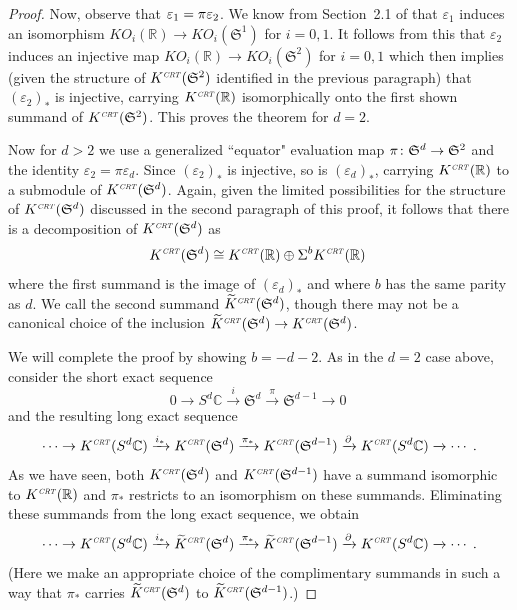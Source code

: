 \documentclass[12pt, reqno]{amsart}
\theoremstyle{definition}
\def\ve{\varepsilon}
\def\R{{\mathbb R}}
\def\C{{\mathbb C}}
\def\crt{^{\scriptscriptstyle {\it CRT}}}
\newcommand{\fS}{\mathfrak S}
\begin{document}
\begin{proof}
Now, observe that $\ve_1 = \pi_{\rm } \ve_2$. We know from Section~2.1 of \cite{Boer2002} that $\ve_1$ induces an isomorphism  $KO_i(\R) \rightarrow KO_i(\fS^1)$ for $i = 0,1$. It follows from this that $\ve_2$ induces an injective map $KO_i(\R) \rightarrow KO_i(\fS^2)$ for $i = 0,1$ which then implies (given the structure of $K\crt(\fS^2)$ identified in the previous paragraph) that $(\ve_2)_*$ is injective, carrying $K\crt(\R)$ isomorphically onto the first shown summand of $K\crt(\fS^2)$. This proves the theorem for $d= 2$.

Now for $d > 2$ we use a generalized ``equator" evaluation map $\pi_{\rm{}} \colon \fS^d \rightarrow \fS^2$ and the identity $\ve_2  = \pi \ve_d$. Since $(\ve_2)_*$ is injective, so is $(\ve_d)_*$, carrying $K\crt(\R)$ to a submodule of $K\crt(\fS^d)$. Again, given the limited possibilities for the structure of $K\crt(\fS^d)$ discussed in the second paragraph of this proof, it follows that there is a decomposition of $K\crt(\fS^d)$ as
$$K\crt(\fS^d) \cong K\crt(\R) \oplus \Sigma^b K\crt(\R) \; $$
where the first summand is the image of $(\ve_d)_*$ and where $b$ has the same parity as $d$.
We call the second summand $\widetilde{K}\crt(\fS^d)$, though there may not be a canonical choice of the inclusion $\widetilde{K}\crt(\fS^d) \rightarrow K\crt(\fS^d)$.

We will complete the proof by showing $b = -d-2$.
As in the $d= 2$ case above, consider the short exact sequence 
$$0 \rightarrow S^d \C \xrightarrow{i} \fS^d \xrightarrow{\pi} \fS^{d-1} \rightarrow 0 \;$$
and the resulting long exact sequence
$$ \cdots \rightarrow K\crt( S^d \C) \xrightarrow{i_*} K\crt(\fS^d) \xrightarrow{\pi_*} K\crt(\fS^{d-1}) \xrightarrow{\partial} 
	K\crt( S^d \C) \xrightarrow{} \cdots  \; .$$
As we have seen, both $K\crt(\fS^d)$ and $K\crt(\fS^{d-1})$ have a summand isomorphic to $K\crt(\R)$ and $\pi_*$ restricts to an isomorphism on these summands. 
Eliminating these summands from the long exact sequence, we obtain
$$ \cdots \rightarrow K\crt( S^d \C) \xrightarrow{i_*} \widetilde{K}\crt(\fS^d) \xrightarrow{\pi_*} \widetilde{K}\crt(\fS^{d-1}) \xrightarrow{\partial} 
	K\crt( S^d \C) \xrightarrow{} \cdots  \; .$$
(Here we make an appropriate choice of the complimentary summands in such a way that $\pi_*$ carries $ \widetilde{K}\crt(\fS^d)$ to $ \widetilde{K}\crt(\fS^{d-1})$.)
	

\end{proof}
\end{document}
